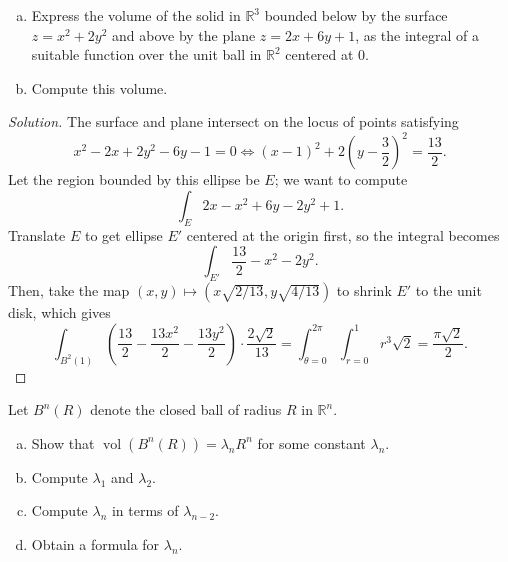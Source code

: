 \documentclass[10pt]{scrartcl}
\providecommand{\RR}{\mathbb R}
\providecommand{\ii}{\item}
\newenvironment{soln}{\begin{proof}[Solution]}{\end{proof}}
\begin{document}
\begin{problem}
	\begin{enumerate}[(a)]
		\ii Express the volume of the solid in $\RR^3$ bounded below
		by the surface $z=x^2+2y^2$ and above by the plane $z=2x+6y+1$,
		as the integral of a suitable function over
		the unit ball in $\RR^2$ centered at $0$.
		\ii Compute this volume.
	\end{enumerate}
\end{problem}

\begin{soln}
	The surface and plane intersect on the locus of points satisfying
	\[x^2-2x+2y^2-6y-1=0\iff
	(x-1)^2 + 2\left(y-\frac{3}{2}\right)^2 = \frac{13}{2}.\]
	Let the region bounded by this ellipse be $E$; we want to compute
	\[\int_E 2x-x^2+6y-2y^2+1.\]
	Translate $E$ to get ellipse $E'$ centered at the origin first,
	so the integral becomes
	\[\int_{E'} \frac{13}{2} - x^2 - 2y^2.\]
	Then, take the map $(x,y)\mapsto(x\sqrt{2/13}, y\sqrt{4/13})$
	to shrink $E'$ to the unit disk, which gives
	\[\int_{B^2(1)}\left(\frac{13}{2}-\frac{13x^2}{2} - \frac{13y^2}{2}\right)
	\cdot \frac{2\sqrt2}{13}
	= \int_{\theta=0}^{2\pi}\int_{r=0}^1 r^3\sqrt2
	= \boxed{\frac{\pi\sqrt2}{2}}.\]
\end{soln}

\begin{problem}
	Let $B^n(R)$ denote the closed ball of radius $R$ in $\RR^n$.
	\begin{enumerate}[(a)]
		\ii Show that $\operatorname{vol}(B^n(R)) = \lambda_nR^n$
		for some constant $\lambda_n$.
		\ii Compute $\lambda_1$ and $\lambda_2$.
		\ii Compute $\lambda_n$ in terms of $\lambda_{n-2}$.
		\ii Obtain a formula for $\lambda_n$.
	\end{enumerate}
\end{problem}
\end{document}
